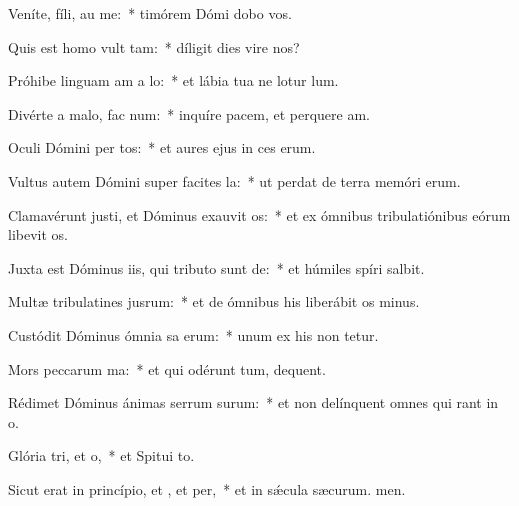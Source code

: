 \item Veníte, fíli, au me:~* timórem Dómi dobo vos.
\item Quis est homo  vult tam:~* díligit dies vire nos?
\item Próhibe linguam am a lo:~* et lábia tua ne lotur lum.
\item Divérte a malo,  fac num:~* inquíre pacem, et perquere am.
\item Oculi Dómini per tos:~* et aures ejus in ces erum.
\item Vultus autem Dómini super facites la:~* ut perdat de terra memóri erum.
\item Clamavérunt justi, et Dóminus exauvit os:~* et ex ómnibus tribulatiónibus eórum libevit os.
\item Juxta est Dóminus iis, qui tributo sunt de:~* et húmiles spíri salbit.
\item Multæ tribulatines jusrum:~* et de ómnibus his liberábit os minus.
\item Custódit Dóminus ómnia sa erum:~* unum ex his non tetur.
\item Mors peccarum ma:~* et qui odérunt tum, dequent.
\item Rédimet Dóminus ánimas serrum surum:~* et non delínquent omnes qui rant in o.
\item Glória tri, et o,~* et Spitui to.
\item Sicut erat in princípio, et , et per,~* et in sǽcula sæcurum. men.
